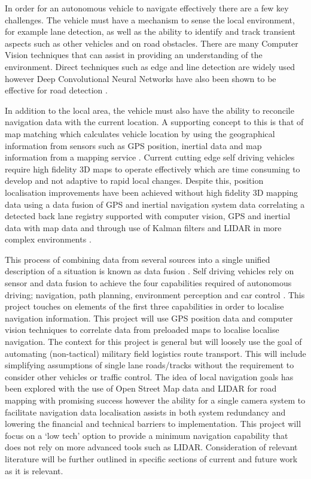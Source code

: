 \documentclass[]{aiaa-tc}%
\begin{document}
In order for an autonomous vehicle to navigate effectively there are a few key challenges. The vehicle must have a mechanism to sense the local environment, for example lane detection, as well as the ability to identify and track transient aspects such as other vehicles and on road obstacles. There are many Computer Vision techniques that can assist in providing an understanding of the environment. Direct techniques such as edge and line detection are widely used however Deep Convolutional Neural Networks have also been shown to be effective for road detection \citep{deepRoadSegmentation}.

In addition to the local area, the vehicle must also have the ability to reconcile navigation data with the current location. A supporting concept to this is that of map matching which calculates vehicle location by using the geographical information from sensors such as GPS position, inertial data and map information from a mapping service \citep{keyTechSelfDriving}. Current cutting edge self driving vehicles require high fidelity 3D maps to operate effectively which are time consuming to develop and not adaptive to rapid local changes. Despite this, position localisation improvements have been achieved without high fidelity 3D mapping data using a data fusion of GPS and inertial navigation system data \citep{gpsInsFusion} correlating a detected back lane registry supported with computer vision, GPS and inertial data with map data \citep{lowCostSensorNav} and through use of Kalman filters and LIDAR in more complex environments \citep{robotLIDARSLAM}.

This process of combining data from several sources into a single unified description of a situation is known as data fusion \citep{gpsInsFusion}. Self driving vehicles rely on sensor and data fusion to achieve the four capabilities required of autonomous driving; navigation, path planning, environment perception and car control \citep{keyTechSelfDriving}. This project touches on elements of the first three capabilities in order to localise navigation information. This project will use GPS position data and computer vision techniques to correlate data from preloaded maps to localise localise navigation. The context for this project is general but will loosely use the goal of automating (non-tactical) military field logistics route transport. This will include simplifying assumptions of single lane roads/tracks without the requirement to consider other vehicles or traffic control. The idea of local navigation goals has been explored with the use of Open Street Map data and LIDAR for road mapping with promising success \citep{mitLocalNavDriving} however the ability for a single camera system to facilitate navigation data localisation assists in both system redundancy and lowering the financial and technical barriers to implementation. This project will focus on a `low tech' option to provide a minimum navigation capability that does not rely on more advanced tools such as LIDAR. Consideration of relevant literature will be further outlined in specific sections of current and future work as it is relevant.
\end{document}

